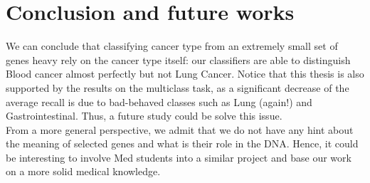 \documentclass[a4paper,11pt, oneside]{article}  %
\begin{document}
\section{Conclusion and future works}
We can conclude that classifying cancer type from an extremely small set of genes heavy rely on the cancer type itself: our classifiers are able to distinguish Blood cancer almost perfectly but not Lung Cancer. Notice that this thesis is also supported by the results on the multiclass task, as a significant decrease of the average recall is due to bad-behaved classes such as Lung (again!) and Gastrointestinal. Thus, a future study could be solve this issue. \\ 
From a more general perspective, we admit that we do not have any hint about the meaning of selected genes and what is their role in the DNA. Hence, it could be interesting to involve Med students into a similar project and base our work on a more solid medical knowledge. 
\end{document}
